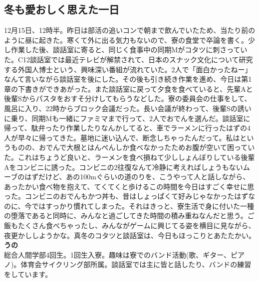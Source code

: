 \vspace{1em}
\begin{myboxnote}
\subsection{冬も愛おしく思えた一日}
\noindent
12月15日、12時半。昨日は部活の追いコンで朝まで飲んでいたため、当たり前のように昼に起きた。寒くて外に出る気力もないので、寮の食堂で卒論を書く。少し作業した後、談話室に寄ると、同じく食事中の同期Mがコタツに刺さっていた。C12談話室では最近テレビが解禁されて、日本のスナック文化について研究する外国人博士という、興味深い番組が流れていた。2人で「面白かったねー」なんて言いながら談話室を後にした。その後も引き続き作業を進め、今日は第1章の下書きができあがった。また談話室に戻って夕食を食べていると、先輩Aと後輩Sからパスタをおすそ分けしてもらうなどした。寮の委員会の仕事をして、風呂に入り、22時からブロック会議だった。長い会議が終わって、後輩Sの誘いに乗り、同期Mも一緒にファミマまで行って、2人でおでんを選んだ。談話室に帰って、駄弁ったり作業したりなんかしてると、車でラーメンに行ったはずの4人が早々に帰ってきた。墓地に迷い込んで、断念しちゃったんだって。私はというものの、おでんで大根とはんぺんしか食べなかったためお腹が空いて困っていた。これはちょうど良いと、ラーメンを食べ損ねて少ししょんぼりしている後輩Aをコンビニに誘った。コンビニの2往復なんて冷静に考えればしょうもないムーブのはずだけど、あの100mぐらいの道のりを、こうやって人と話しながら、あったかい食べ物を抱えて、てくてくと歩けるこの時間を今日はすごく幸せに思った。コンビニのおでんもかつ丼も、昔はしょっぱくて好みじゃなかったはずなのに、今ではすっかり慣れてしまった。それはきっと、寮生活で身に付いた一種の堕落であると同時に、みんなと過ごしてきた時間の積み重ねなんだと思う。ご飯もたくさん食べちゃったし、みんながゲームに興じてる姿を横目に見ながら、夜更かししようかな。真冬のコタツと談話室は、今日もほっこりとあたたかい。\\

\noindent
\textbf{うの}\\
総合人間学部4回生。1回生入寮。趣味は寮でのバンド活動(歌、ギター、ピアノ)。体育会サイクリング部所属。談話室では主に皆と話したり、バンドの練習をしています。

\vspace{1em}

\end{myboxnote}

